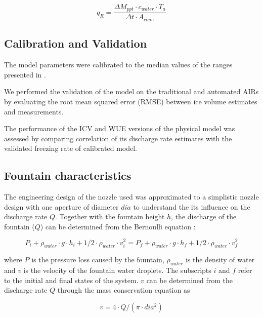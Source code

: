 \documentclass[tc, manuscript]{copernicus}
\begin{document}
\begin{equation}
  q_{R} = \frac{\Delta M_{ppt} \cdot c_{water} \cdot T_{a}}{\Delta t \cdot A_{cone}}
\end{equation}

\subsection{Calibration and Validation}

The model parameters were calibrated to the median values of the ranges presented in
\cite{balasubramanianInfluenceMeteorologicalConditions2022}.

We performed the validation of the model on the traditional and automated AIRs by evaluating the root mean
squared error (RMSE) between ice volume estimates and measurements. 

The performance of the ICV and WUE versions of the physical model was assessed by comparing correlation of its
discharge rate estimates with the validated freezing rate of calibrated model.

\subsection{Fountain characteristics}

The engineering design of the nozzle used was approximated to a simplistic nozzle design with one aperture of
diameter $dia$ to understand the its influence on the discharge rate $Q$. Together with the fountain height $h$,
the discharge of the fountain ($Q$) can be determined from the Bernoulli equation :

\begin{equation}
  \label{eqn:fountain}
  P_{i} + \rho_{water} \cdot g \cdot h_{i} + 1/2 \cdot \rho_{water} \cdot v_{i}^2 = P_{f} + \rho_{water} \cdot g
  \cdot h_{f} + 1/2 \cdot \rho_{water} \cdot v_{f}^2
\end{equation}

where $P$ is the pressure loss caused by the fountain, $\rho_{water}$ is the density of water and $v$ is the
velocity of the fountain water droplets. The subscripts $i$ and $f$ refer to the initial and final states of the
system. $v$ can be determined from the discharge rate $Q$ through the mass conservation equation as 

\begin{equation}
	\label{eqn:dis}
 v = 4 \cdot Q/(\pi \cdot dia^2)
\end{equation}
\end{document}
